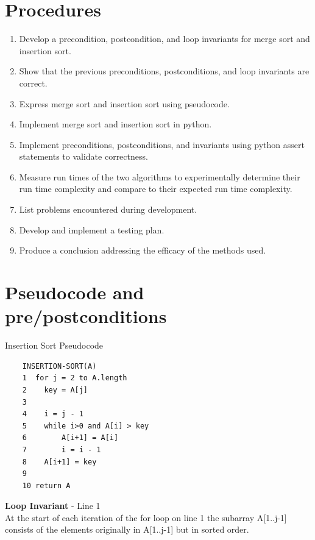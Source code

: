 \documentclass[a4paper]{article}
\begin{document}
    \section{Procedures}
    \begin{enumerate}

        \item Develop a precondition, postcondition, and loop invariants for merge sort
              and insertion sort.
        
        \item Show that the previous preconditions, postconditions, and loop invariants
              are correct.
        
        \item Express merge sort and insertion sort using pseudocode.

        \item Implement merge sort and insertion sort in python.
        
        \item Implement preconditions, postconditions, and invariants using python 
              assert statements to validate correctness.
        
        \item Measure run times of the two algorithms to experimentally determine their
              run time complexity and compare to their expected run time complexity.
        
        \item List problems encountered during development.
        
        \item Develop and implement a testing plan.

        \item Produce a conclusion addressing the efficacy of the methods used.
    \end{enumerate}

    \newpage
    \section{Pseudocode and pre/postconditions}
    
    Insertion Sort Pseudocode
    \begin{verbatim}
    INSERTION-SORT(A)
    1  for j = 2 to A.length
    2    key = A[j]
    3   
    4    i = j - 1
    5    while i>0 and A[i] > key
    6        A[i+1] = A[i]
    7        i = i - 1
    8    A[i+1] = key
    9 
    10 return A\end{verbatim}
    \textbf{Loop Invariant} - Line 1\\
    At the start of each iteration of the for loop on line 1 the subarray A[1..j-1]
    consists of the elements originally in A[1..j-1] but in sorted order.
\end{document}
